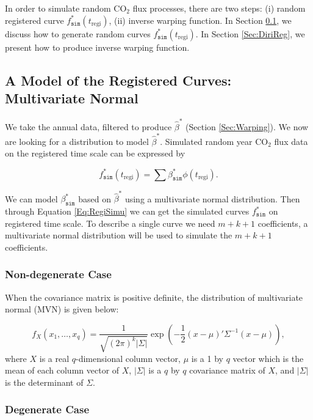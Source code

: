 \documentclass{article}\usepackage[]{graphicx}\usepackage[]{color}
\begin{document}
In order to simulate random CO$_2$ flux processes, there are two steps: (i) random registered curve $f^{*}_{\texttt{sim}}(t_{\textrm{regi}})$, (ii) inverse warping function. In Section \ref{Sec:MultiNormal}, we discuss how to generate random curves $f^{*}_{\texttt{sim}}(t_{\textrm{regi}})$. In Section \ref{Sec:DiriReg}, we present how to produce inverse warping function.


\subsection{A Model of the Registered Curves: Multivariate Normal}\label{Sec:MultiNormal}

We take the annual data, filtered to produce $\widehat{\beta}^{*}$ (Section \ref{Sec:Warping}). We now are looking for a distribution to model $\widehat{\beta}^{*}$. Simulated random year CO$_2$ flux data on the registered time scale can be expressed by

\begin{equation}
f^{*}_{\texttt{sim}}(t_{\textrm{regi}}) = \sum\beta^{*}_{\texttt{sim}}\phi(t_{\textrm{regi}}).\label{Eq:RegiSimu}
\end{equation}

We can model $\beta^{*}_{\texttt{sim}}$ based on $\widehat{\beta}^{*}$ using a multivariate normal distribution. Then through Equation \ref{Eq:RegiSimu} we can get the simulated curves $f^{*}_{\texttt{sim}}$ on registered time scale. 
To describe a single curve we need $m+k+1$ coefficients, a multivariate normal distribution will be used to simulate the $m+k+1$ coefficients. 

\subsubsection{Non-degenerate Case}

When the covariance matrix is positive definite,  the distribution of multivariate normal (MVN) is given below:

\begin{equation}
f_X(x_1,\dots,x_{q}) = \frac{1}{\sqrt{(2\pi)^k|\Sigma|}}\exp\left(-\frac{1}{2}(x-\mu)'\Sigma^{-1}(x-\mu)\right),
\end{equation}
where $X$ is a real $q$-dimensional column vector, $\mu$ is a 1 by $q$ vector which is the mean of each column vector of $X$, $|\Sigma|$ is a $q$ by $q$ covariance matrix of $X$,  and $|\Sigma|$ is the determinant of $\Sigma$. 

\subsubsection{Degenerate Case}
\end{document}
